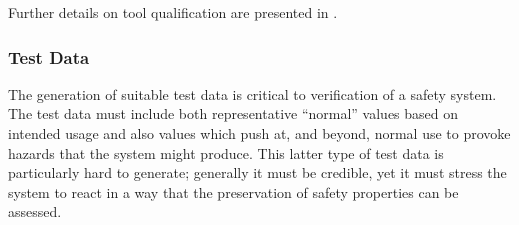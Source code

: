 

Further details on tool qualification are presented in .

\subsubsection{Test Data}
The generation of suitable test data is critical to verification of a safety system. The test data must include both representative ``normal'' values based on intended usage and also values which push at, and beyond, normal use to provoke \glspl{hazard} that the system might produce. This latter type of test data is particularly hard to generate; generally it must be credible, yet it must stress the system to react in a way that the preservation of safety properties can be assessed. 

